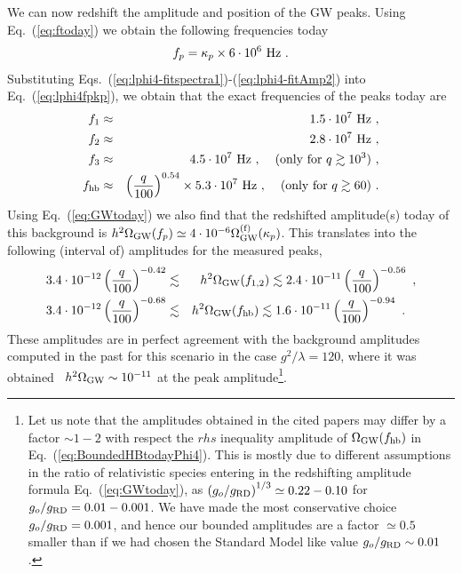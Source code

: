 \documentclass[a4paper,11pt]{article}
\newcommand{\be}{\begin{equation}}
\newcommand{\ee}{\end{equation}}
\newcommand{\bea}{\begin{eqnarray}}
\newcommand{\eea}{\end{eqnarray}}
\begin{document}
We can now redshift the amplitude and position of the GW peaks. Using Eq.~(\ref{eq:ftoday})
we obtain the following frequencies
today
\be f_p = \kappa_p \times 6 \cdot 10^6 \ {\rm Hz}\label{eq:lphi4fpkp} \ . \ee
Substituting Eqs.~(\ref{eq:lphi4-fitspectra1})-(\ref{eq:lphi4-fitAmp2}) into Eq.~(\ref{eq:lphi4fpkp}), we obtain that the exact frequencies of the peaks today are
\bea
f_1 &\approx &
1.5 \cdot 10^7 \ {\rm Hz} \ , \\
f_2 & \approx &
2.8 \cdot 10^7 \  {\rm Hz} \ , \\
f_3 & \approx &
4.5 \cdot 10^7 \  {\rm Hz}   \ , \hspace{0.4cm} ({\rm only\,\,for\,\,} q \gtrsim 10^3) \ , \\
f_{\rm hb} &\approx  &  \left( \frac{q}{100} \right)^{0.54}
\times 5.3 \cdot 10^7 \ {\rm Hz}  \ , \hspace{0.4cm} ({\rm only\,\,for\,\,} q \gtrsim 60) \ .
\eea
Using Eq.~(\ref{eq:GWtoday}) we also find that the redshifted amplitude(s) today of this background is $h^2 \Omega_{\rm GW}(f_p) \simeq 4\cdot 10^{-6} \Omega_{\rm GW}^{\rm (f)}(\kappa_p)$. This translates into the following (interval of) amplitudes for the measured peaks,
\bea \label{eq:BoundedIRtodayPhi4}
  3.4 \cdot 10^{-12} \left( \frac{q}{100} \right)^{-0.42} &\lesssim & h^2 \Omega_{\rm GW} (f_{1,2}) \lesssim 2.4 \cdot 10^{-11}  \left( \frac{q}{100} \right)^{-0.56}  \ , \\
  \label{eq:BoundedHBtodayPhi4}
  3.4 \cdot 10^{-12}  \left( \frac{q}{100} \right)^{-0.68} & \lesssim & h^2 \Omega_{\rm GW} (f_{\rm hb}) \lesssim 1.6 \cdot 10^{-11}  \left( \frac{q}{100} \right)^{-0.94}  \ . \hspace{0.3cm} 
\eea
These amplitudes are in perfect agreement with the background amplitudes computed in the past for this scenario in the case $g^2/\lambda = 120$, where it was obtained~\cite{Easther:2006vd,GarciaBellido:2007af,Easther:2007vj,Price:2008hq} $h^2\Omega_{\rm GW} \sim 10^{-11}$ at the peak amplitude\footnote{Let us note that the amplitudes obtained in the cited papers may differ by a factor $\sim 1-2$ with respect the $rhs$ inequality amplitude of $\Omega_{\rm GW} (f_{\rm hb})$ in Eq.~(\ref{eq:BoundedHBtodayPhi4}). This is mostly due to different assumptions in the ratio of relativistic species entering in the redshifting amplitude formula Eq.~(\ref{eq:GWtoday}), as $\left(g_{o}/g_{\rm RD}\right)^{1/3} \simeq 0.22-0.10$ for $g_{o}/g_{\rm RD} = 0.01-0.001$. We have made the most conservative choice $g_{o}/g_{\rm RD} = 0.001$, and hence our bounded amplitudes are a factor $\simeq 0.5$ smaller than if we had chosen the Standard Model like value $g_{o}/g_{\rm RD} \sim 0.01$.}.
\end{document}
